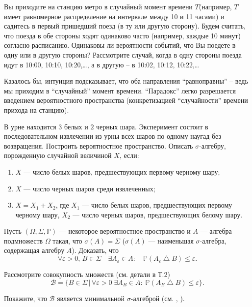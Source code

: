 \begin{problem}
Вы приходите на станцию метро в случайный момент времени $T$(например, $T$ имеет равномерное распределение на интервале между 10 и 11 часами) и садитесь в первый пришедший поезд (в ту или другую сторону). Будем считать, что поезда в обе стороны ходят одинаково часто (например, каждые 10 минут) согласно расписанию. Одинаковы ли вероятности событий, что Вы поедете в одну или в другую стороны? Рассмотрите случай, когда в одну стороны поезда идут в 10:00, 10:10, 10:20,\dots , а в другую -- в 10:02, 10:12, 10:22,\dots 
\end{problem}


\begin{remark} Казалось бы, интуиция подсказывает, что оба направления ``равноправны'' -- ведь мы приходим в ``случайный'' момент времени. ``Парадокс'' легко разрешается введением вероятностного пространства (конкретизацией ``случайности'' времени прихода на станцию).
\end{remark}

\begin{problem}
В урне находится $3$ белых и $2$ черных шара. 
Эксперимент состоит в последовательном извлечении из урны всех шаров по одному наугад без возвращения. Построить вероятностное пространство. 
Описать $\sigma$-алгебру, порожденную случайной величиной $X$, если: 
\begin{enumerate}
\item $X$ --- число белых шаров, предшествующих первому черному шару; 
\item $X$ --- число черных шаров среди извлеченных; 
\item $X=X_1+X_2$, где $X_1$ --- число белых шаров, предшествующих первому черному шару, 
$X_2$ --- число черных шаров, предшествующих белому шару. 
\end{enumerate}
\end{problem}


\begin{problem}\Star
\label{SigmaAlgebra}
Пусть $(\Omega,\Sigma,{\mathbb P})$ --- некоторое вероятностное пространство и $A$ --- алгебра подмножеств $\Omega$ такая, что 
$\sigma(A)=\Sigma$ ($\sigma(A)$ --- наименьшая $\sigma$-алгебра, содержащая алгебру $A$). Доказать, что 
$$
\forall\varepsilon>0,\, B\in\Sigma\quad \exists A_{\varepsilon}\in A:\quad {\mathbb P}(A_{\varepsilon}\bigtriangleup B)
\leqslant\varepsilon . 
$$
\end{problem}

\begin{ordre}
Рассмотрите совокупность множеств (см. детали в \cite{21} Т.2) 
$$
{\mathcal B}=\bigl\{ B\in\Sigma\, | \, \forall\varepsilon>0 \; \exists A_B\in A:\; {\mathbb P}(A_B\bigtriangleup B)
\leqslant\varepsilon \bigr\} . 
$$

\noindent Покажите, что ${\mathcal B}$ является минимальной $\sigma$-алгеброй (см. \cite{22}, \cite{220}).

\end{ordre}



